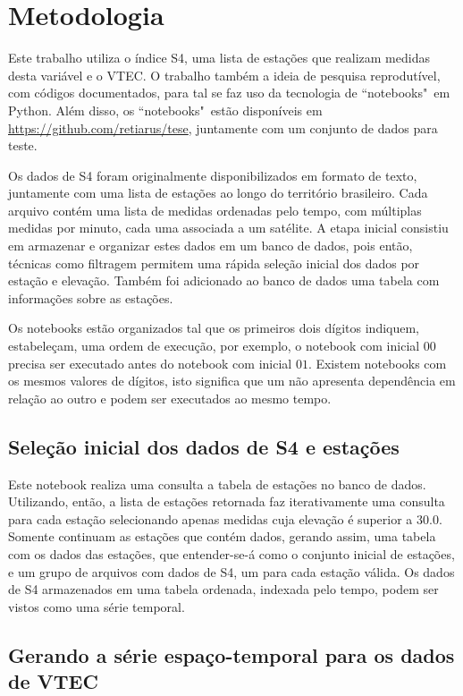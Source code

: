 \chapter{Metodologia}

Este trabalho utiliza o índice S4, uma lista de estações que realizam medidas desta variável e o VTEC. O trabalho também a ideia de pesquisa reprodutível, com códigos documentados, para tal se faz uso da tecnologia de ``notebooks"~em Python. Além disso, os ``notebooks"~estão disponíveis em \url{https://github.com/retiarus/tese}, juntamente com um conjunto de dados para teste. 

Os dados de S4 foram originalmente disponibilizados em formato de texto, juntamente com uma lista de estações ao longo do território brasileiro. Cada arquivo contém uma lista de medidas ordenadas pelo tempo, com múltiplas medidas por minuto, cada uma associada a um satélite. A etapa inicial consistiu em armazenar e organizar estes dados em um banco de dados, pois então, técnicas como filtragem permitem uma rápida seleção inicial dos dados por estação e elevação. Também foi adicionado ao banco de dados uma tabela com informações sobre as estações.

Os notebooks estão organizados tal que os primeiros dois dígitos indiquem, estabeleçam, uma ordem de execução, por exemplo, o notebook com inicial $00$ precisa ser executado antes do notebook com inicial $01$. Existem notebooks com os mesmos valores de dígitos, isto significa que um não apresenta dependência em relação ao outro e podem ser executados ao mesmo tempo.

\section{Seleção inicial dos dados de S4 e estações}

Este notebook realiza uma consulta a tabela de estações no banco de dados. Utilizando, então, a lista de estações retornada faz iterativamente uma consulta para cada estação selecionando apenas medidas cuja elevação é superior a 30.0. Somente continuam as estações que contém dados, gerando assim, uma tabela com os dados das estações, que entender-se-á como o conjunto inicial de estações, e um grupo de arquivos com dados de S4, um para cada estação válida. Os dados de S4 armazenados em uma tabela ordenada, indexada pelo tempo, podem ser vistos como uma série temporal.

\section{Gerando a série espaço-temporal para os dados de VTEC}

